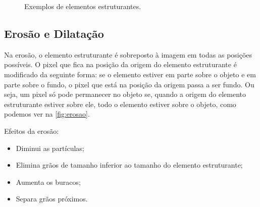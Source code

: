 \begin{figure}[ht]
 \begin{center}
  \hspace{1.5cm}
  \hspace{1.5cm}
 \end{center}
 \caption{Exemplos de elementos estruturantes.}
 \label{fig:elemento_estruturante}
\end{figure}

\subsection{Erosão e Dilatação}

Na erosão, o elemento estruturante é sobreposto à imagem em todas as posições possíveis. O pixel que fica na posição da origem do elemento estruturante é modificado da seguinte forma: se o elemento estiver em parte sobre o objeto e em parte sobre o fundo, o pixel que está na posição da origem passa a ser fundo. Ou seja, um pixel só pode permanecer no objeto se, quando a origem do elemento estruturante estiver sobre ele, todo o elemento estiver sobre o objeto, como podemos ver na \ref{fig:erosao}.

Efeitos da erosão:

\begin{itemize}
 \item Diminui as partículas;
 \item Elimina grãos de tamanho inferior ao tamanho do elemento estruturante;
 \item Aumenta os buracos;
 \item Separa grãos próximos.
\end{itemize}


